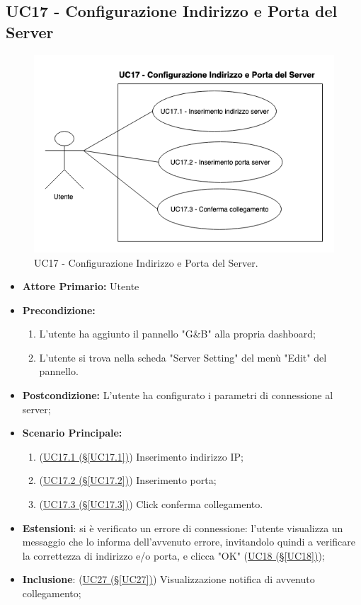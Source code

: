 \pagebreak

\subsection{UC17 - Configurazione Indirizzo e Porta del Server}\label{UC17}
\begin{figure}[H]
	\centering
	\includegraphics[scale=0.65]{./images/UC17.png}
	\caption{UC17 - Configurazione Indirizzo e Porta del Server.}
\end{figure}
\begin{itemize}
	\item \textbf{Attore Primario:}  Utente
	\item \textbf{Precondizione:} 
		\begin{enumerate}
			\item L'utente ha aggiunto il pannello "G\&B" alla propria dashboard;
			\item L'utente si trova nella scheda "Server Setting" del menù "Edit" del pannello.
		\end{enumerate}	
	\item \textbf{Postcondizione:} L'utente ha configurato i parametri di connessione al server;
	\item \textbf{Scenario Principale:}
	\begin{enumerate}
		\item (\hyperref[UC17.1]{UC17.1 (§\ref*{UC17.1})}) Inserimento indirizzo IP; 
		\item (\hyperref[UC17.2]{UC17.2 (§\ref*{UC17.2})}) Inserimento porta;
		\item (\hyperref[UC17.3]{UC17.3 (§\ref*{UC17.3})}) Click conferma collegamento.
	\end{enumerate}
	\item \textbf{Estensioni}: si è verificato un errore di connessione: l'utente visualizza un messaggio che lo informa dell'avvenuto errore, invitandolo quindi a verificare la correttezza di indirizzo e/o porta, e clicca "OK" (\hyperref[UC18]{UC18 (§\ref*{UC18})});
	\item  \textbf{Inclusione}: (\hyperref[UC27]{UC27 (§\ref*{UC27})}) Visualizzazione notifica di avvenuto collegamento;
\end{itemize}

